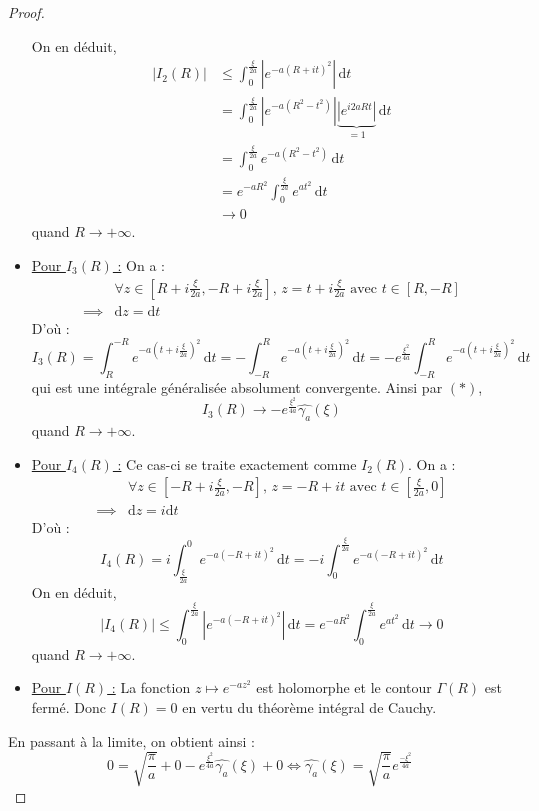 \begin{proof}
\begin{itemize}
			On en déduit,
			\begin{align*}
				|I_2(R)| &\leq \int_0^{\frac{\xi}{2a}} \left| e^{-a (R+it)^2} \right| \, \mathrm{d}t \\
				&= \int_0^{\frac{\xi}{2a}} \left| e^{-a(R^2 - t^2)} \right| \underbrace{\left| e^{i 2aRt} \right|}_{= 1} \, \mathrm{d}t \\
				&= \int_0^{\frac{\xi}{2a}} e^{-a(R^2 - t^2)} \, \mathrm{d}t \\
				&= e^{-aR^2} \int_0^{\frac{\xi}{2a}} e^{at^2} \, \mathrm{d}t \\
				&\longrightarrow 0
			\end{align*}
			quand $R \longrightarrow +\infty$.
			\item \underline{Pour $I_3(R)$ :} On a :
			\begin{align*}
				&\forall z \in \left[ R + i \frac{\xi}{2a}, -R + i \frac{\xi}{2a} \right], \, z = t + i\frac{\xi}{2a} \text{ avec $t \in \left[ R, -R \right]$} \\
				\implies& \mathrm{d}z = \mathrm{d}t
			\end{align*}
			D'où :
			\[ I_3(R) = \int_R^{-R} e^{-a \left(t + i \frac{\xi}{2a} \right)^2} \, \mathrm{d}t = - \int_{-R}^R e^{-a \left(t + i \frac{\xi}{2a} \right)^2} \, \mathrm{d}t = - e^{\frac{\xi^2}{4a}} \int_{-R}^R e^{-a \left( t + i \frac{\xi}{2a} \right)^2} \, \mathrm{d}t \]
			qui est une intégrale généralisée absolument convergente. Ainsi par $(*)$,
			\[ I_3(R) \longrightarrow - e^{\frac{\xi^2}{4a}} \widehat{\gamma_a}(\xi) \]
			quand $R \longrightarrow +\infty$.
			\item \underline{Pour $I_4(R)$ :} Ce cas-ci se traite exactement comme $I_2(R)$. On a :
			\begin{align*}
				&\forall z \in \left[ -R + i \frac{\xi}{2a}, -R \right], \, z = -R + it \text{ avec $t \in \left[ \frac{\xi}{2a}, 0 \right]$} \\
				\implies& \mathrm{d}z = i\mathrm{d}t
			\end{align*}
			D'où :
			\[ I_4(R) = i \int_{\frac{\xi}{2a}}^0 e^{-a (-R+it)^2} \, \mathrm{d}t = -i \int_0^{\frac{\xi}{2a}} e^{-a (-R+it)^2} \, \mathrm{d}t \]
			On en déduit,
			\[ |I_4(R)| \leq \int_0^{\frac{\xi}{2a}} \left| e^{-a (-R+it)^2} \right| \, \mathrm{d}t = e^{-aR^2} \int_0^{\frac{\xi}{2a}} e^{at^2} \, \mathrm{d}t \longrightarrow 0 \]
			quand $R \longrightarrow +\infty$.
			\item \underline{Pour $I(R)$ :} La fonction $z \mapsto e^{-az^2}$ est holomorphe et le contour $\Gamma(R)$ est fermé. Donc $I(R) = 0$ en vertu du théorème intégral de Cauchy.
		\end{itemize}
		En passant à la limite, on obtient ainsi :
		\[ 0 = \sqrt{\frac{\pi}{a}} + 0 - e^{\frac{\xi^2}{4a}} \widehat{\gamma_a}(\xi) + 0 \iff \widehat{\gamma_a}(\xi) = \sqrt{\frac{\pi}{a}} e^{\frac{- \xi^2}{4a}} \]
	\end{proof}

